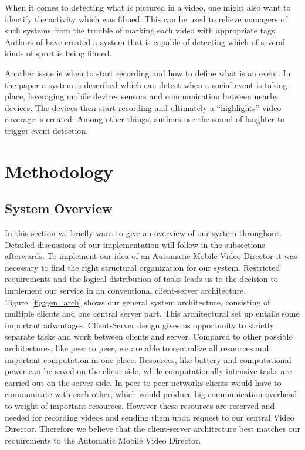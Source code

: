 \documentclass[conference]{IEEEtran}
\begin{document}
When it comes to detecting what is pictured in a video, one might also want to identify the activity which was filmed.
This can be used to relieve managers of such systems from the trouble of marking each video with appropriate tags. 
Authors of \cite{cricri_sport_2014} have created a system that is capable of detecting which of several kinds of sport is being filmed.

Another issue is when to start recording and how to define what is an event.
In the paper \cite{bao_movi:_2010} a system is described which can detect when a social event is taking place, leveraging
mobile devices sensors and communication between nearby devices.
The devices then start recording and ultimately a ``highlights'' video coverage is created.
Among other things, authors use the sound of laughter to trigger event detection.

\section{Methodology}

\subsection{System Overview}
In this section we briefly want to give an overview of our system throughout.
Detailed discussions of our implementation will follow in the subsections afterwards. 
To implement our idea of an Automatic Mobile Video Director it was necessary to find the right structural organization for our system.
Restricted requirements and the logical distribution of tasks leads us to the decision 
to implement our service in an conventional client-server architecture.
Figure~\ref{fig:gen_arch} shows our general system architecture, consisting of multiple clients and one central server part.
This architectural set up entails some important advantages.
Client-Server design gives us opportunity to strictly separate tasks and work between clients and server.
Compared to other possible architectures, like peer to peer, we are able to centralize all resources
and important computation in one place. 
Resources, like battery and computational power can be saved on the client side, 
while computationally intensive tasks are carried out on the server side. 
In peer to peer networks clients would have to communicate with each other, 
which would produce big communication overhead to weight of important resources.
However these resources are reserved and needed for recording videos and sending them upon request to our central Video Director.
Therefore we believe that the client-server architecture best matches our requirements to the Automatic Mobile Video Director.
\end{document}
